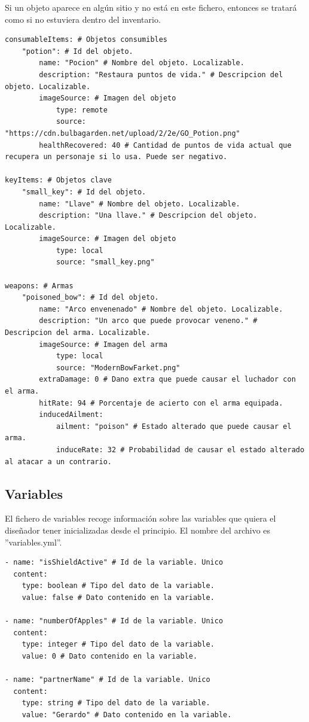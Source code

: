 Si un objeto aparece en algún sitio y no está en este fichero, entonces se tratará como si no estuviera dentro del inventario.

\begin{lstlisting}
consumableItems: # Objetos consumibles
	"potion": # Id del objeto.
		name: "Pocion" # Nombre del objeto. Localizable.
		description: "Restaura puntos de vida." # Descripcion del objeto. Localizable.
		imageSource: # Imagen del objeto
			type: remote
			source: "https://cdn.bulbagarden.net/upload/2/2e/GO_Potion.png"
		healthRecovered: 40 # Cantidad de puntos de vida actual que recupera un personaje si lo usa. Puede ser negativo.
		
keyItems: # Objetos clave
	"small_key": # Id del objeto.
		name: "Llave" # Nombre del objeto. Localizable.
		description: "Una llave." # Descripcion del objeto. Localizable.
		imageSource: # Imagen del objeto
			type: local
			source: "small_key.png"
			
weapons: # Armas
	"poisoned_bow": # Id del objeto.
		name: "Arco envenenado" # Nombre del objeto. Localizable.
		description: "Un arco que puede provocar veneno." # Descripcion del arma. Localizable.
		imageSource: # Imagen del arma
			type: local
			source: "ModernBowFarket.png"
		extraDamage: 0 # Dano extra que puede causar el luchador con el arma.
		hitRate: 94 # Porcentaje de acierto con el arma equipada.
		inducedAilment: 
			ailment: "poison" # Estado alterado que puede causar el arma.
			induceRate: 32 # Probabilidad de causar el estado alterado al atacar a un contrario.
\end{lstlisting}

\subsection{Variables}
El fichero de variables recoge información sobre las variables que quiera el diseñador tener inicializadas desde el principio. El nombre del archivo es ''variables.yml''.

\begin{lstlisting}
- name: "isShieldActive" # Id de la variable. Unico
  content:
  	type: boolean # Tipo del dato de la variable.
  	value: false # Dato contenido en la variable.

- name: "numberOfApples" # Id de la variable. Unico
  content:
	type: integer # Tipo del dato de la variable.
	value: 0 # Dato contenido en la variable.

- name: "partnerName" # Id de la variable. Unico
  content:
	type: string # Tipo del dato de la variable.
	value: "Gerardo" # Dato contenido en la variable.
\end{lstlisting}
 
